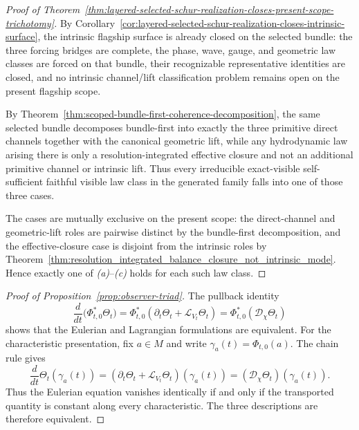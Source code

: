 \begin{proof}[Proof of Theorem~\ref{thm:layered-selected-schur-realization-closes-present-scope-trichotomy}]
\label{proof:thm:layered-selected-schur-realization-closes-present-scope-trichotomy}
By
Corollary~\ref{cor:layered-selected-schur-realization-closes-intrinsic-surface},
the intrinsic flagship surface is already closed on the selected bundle: the
three forcing bridges are complete, the phase, wave, gauge, and geometric law
classes are forced on that bundle, their recognizable representative
identities are closed, and no intrinsic channel/lift classification problem
remains open on the present flagship scope.

By Theorem~\ref{thm:scoped-bundle-first-coherence-decomposition}, the same
selected bundle decomposes bundle-first into exactly the three primitive direct
channels together with the canonical geometric lift, while any hydrodynamic
law arising there is only a resolution-integrated effective closure and not an
additional primitive channel or intrinsic lift. Thus every irreducible
exact-visible self-sufficient faithful visible law class in the generated
family falls into one of those three cases.

The cases are mutually exclusive on the present scope: the direct-channel and
geometric-lift roles are pairwise distinct by the bundle-first decomposition,
and the effective-closure case is disjoint from the intrinsic roles by
Theorem~\ref{thm:resolution_integrated_balance_closure_not_intrinsic_mode}.
Hence exactly one of \emph{(a)}--\emph{(c)} holds for each such law class.
\end{proof}


\begin{proof}[Proof of Proposition~\ref{prop:observer-triad}]
\label{proof:prop:observer-triad}
The pullback identity
\[
\frac{d}{dt}\bigl(\Phi_{t,0}^*\Theta_t\bigr)
=
\Phi_{t,0}^*(\partial_t\Theta_t + \mathcal L_{V_t}\Theta_t)
=
\Phi_{t,0}^*(\mathcal D_\chi \Theta_t)
\]
shows that the Eulerian and Lagrangian formulations are equivalent. For the
characteristic presentation, fix $a \in M$ and write $\gamma_a(t)=\Phi_{t,0}(a)$.
The chain rule gives
\[
\frac{d}{dt}\Theta_t(\gamma_a(t))
=
(\partial_t\Theta_t + \mathcal L_{V_t}\Theta_t)(\gamma_a(t))
=
(\mathcal D_\chi \Theta_t)(\gamma_a(t)).
\]
Thus the Eulerian equation vanishes identically if and only if the transported
quantity is constant along every characteristic. The three descriptions are
therefore equivalent.
\end{proof}


